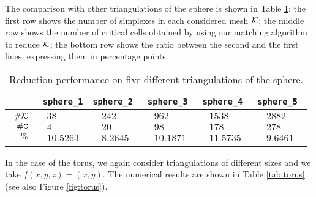 \documentclass[12pt]{article}
\newcommand{\cK}{{\cal K}}
\newcommand{\sC}{\texttt{C}} \newcommand{\sD}{\texttt{D}} \newcommand{\sM}{\texttt{M}} \newcommand{\sL}{\texttt{L}}
\begin{document}
The comparison with other triangulations of the sphere is shown in Table \ref{tab:sphere}:  the first row  shows  the number of  simplexes in each considered mesh $\cK$; the middle row shows the number of critical cells  obtained by using our matching algorithm to reduce $\cK$; the bottom row shows the ratio between the second and the first lines, expressing them in percentage points.

\begin{table}[h]
\caption{Reduction performance on five different triangulations of the sphere. }
\begin{center}
\begin{tabular}{| c | c | c | c | c |c|}
\hline
 & \tt{sphere\_1}&
 \tt{sphere\_2} & \tt{sphere\_3}
 &  \tt{sphere\_4} & \tt{sphere\_5} \\
 \hline
  $\begin{array}{rrr}\# \cK\\ \# \sC\\ \% \end{array}$ &
 $\begin{array}{rrr}  38 \\4 \\10.5263  \end{array}$ &
 $\begin{array}{rrr}  242\\20 \\8.2645  \end{array}$ &
 $\begin{array}{rrr}   962   \\98 \\10.1871  \end{array}$ &
 $\begin{array}{rrr}  1538    \\178 \\11.5735 \end{array}$&
 $\begin{array}{rrr}  2882    \\278 \\9.6461  \end{array}$\\
 \hline
 \end{tabular}
 \end{center}
\label{tab:sphere}
\end{table}

In the case of the torus, we again consider triangulations of different sizes and we take
$f(x,y,z)=(x,y)$. The numerical results are shown in Table \ref{tab:torus} (see also Figure \ref{fig:torus}).
\end{document}
